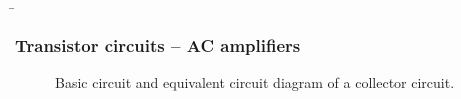 \begin{frame}
    \b{ \frametitle{Transistor circuits -- AC amplifiers}

      \begin{figure}[H]
        
            \begin{minipage}[c]{0.48\textwidth}
                \raggedright
                \scalebox{1.5}{}
            \end{minipage}
            \begin{minipage}[c]{0.48\textwidth}
                \raggedleft
                \scalebox{0.9}{}
            \end{minipage}
            \caption{Basic circuit and equivalent circuit diagram of a collector circuit.} 
        \end{figure}    
        
    \begin{itemize}
    \end{itemize}
    }
\end{frame} 

